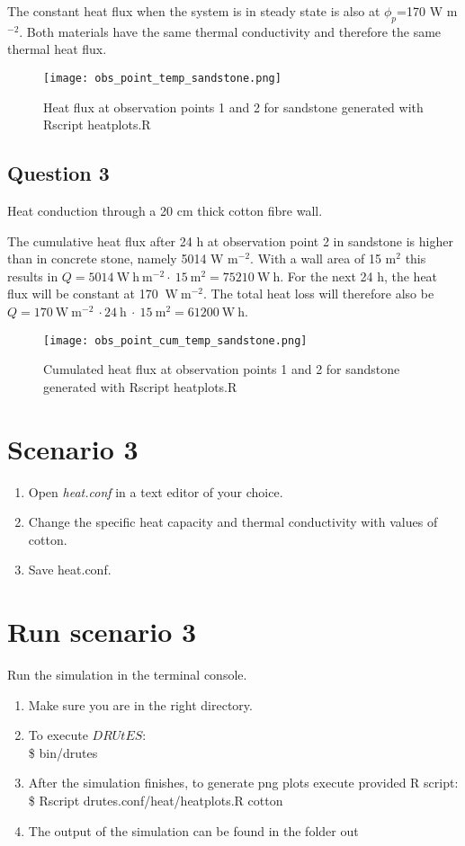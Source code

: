 \documentclass[
10pt, %
a4paper, %
oneside, %
headinclude,footinclude, %
BCOR5mm, %
]{scrartcl}
\begin{document}
The constant heat flux when the system is in steady state is also at $\phi_{p}$=170 W m$^{-2}$. Both materials have the same thermal conductivity and therefore the same thermal heat flux.

\begin{figure}[!h]
\centering
\texttt{[image: obs\_point\_temp\_sandstone.png]}
\caption{\label{plot5} Heat flux at observation points 1 and 2 for sandstone generated with Rscript heatplots.R}
\end{figure}


\subsection*{Question 3}
Heat conduction through a 20 cm thick cotton fibre wall. 

The cumulative heat flux after 24 h at observation point 2 in sandstone is higher than in concrete stone, namely 5014 W m$^{-2}$. With a wall area of 15 m$^2$ this results in $Q = 5014~\mathrm{W~h~m^{-2}}\cdot~15~\mathrm{m^{2}}= 75210 ~\mathrm{W~h}$. 
For the next 24 h, the heat flux will be constant at 170 $\mathrm{~W~m^{-2}}$. The total heat loss will therefore also be $Q=170 \mathrm{~W~m^{-2}}~\cdot 24~\mathrm{h}~\cdot~15~\mathrm{m^{2}}=61200 \mathrm{~W~h}$.

\begin{figure}[!h]
\centering
\texttt{[image: obs\_point\_cum\_temp\_sandstone.png]}
\caption{\label{plot6} Cumulated heat flux at observation points 1 and 2 for sandstone generated with Rscript heatplots.R}
\end{figure}

\newpage
\newpage
\newpage
\clearpage
\section*{Scenario 3}

\begin{enumerate}
\item Open \emph{heat.conf} in a text editor of your choice. 
\item Change the specific heat capacity and thermal conductivity with values of cotton.
\item Save heat.conf.
\end{enumerate}

\section*{Run scenario 3}
Run the simulation in the terminal console.
\begin{enumerate}
\item Make sure you are in the right directory. 
\item To execute $DRUtES$: \\
\$ bin/drutes
\item After the simulation finishes, to generate png plots execute provided R script: \\
\$ Rscript drutes.conf/heat/heatplots.R cotton
\item The output of the simulation can be found in the folder out
\end{enumerate}
\end{document}
